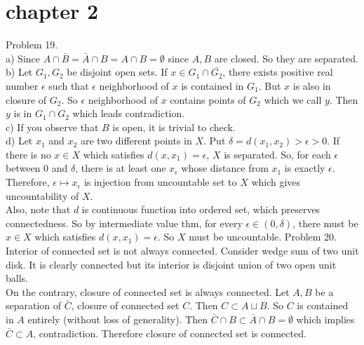 \section*{chapter 2}

Problem 19. \\

a) Since $A \cap \bar{B} = \bar{A} \cap B = A \cap B = \emptyset$ since $A, B$ are closed. So they are separated. \\

b) Let $G_1, G_2$ be disjoint open sets. If $x \in G_1 \cap \bar{G_2}$, there exists positive real number $\epsilon$ such that $\epsilon$ neighborhood of $x$ is contained in $G_1$. But $x$ is also in closure of $G_2$. So $\epsilon$ neighborhood of $x$ contains points of $G_2$ which we call $y$. Then $y$ is in $G_1 \cap G_2$ which leads contradiction. \\

c) If you observe that $B$ is open, it is trivial to check. \\

d) Let $x_1$ and $x_2$ are two different points in $X$. Put $\delta = d(x_1, x_2) > \epsilon > 0$. If there is no $x \in X$ which satisfies $d(x, x_1) = \epsilon$, $X$ is separated. So, for each $\epsilon$ between $0$ and $\delta$, there is at least one $x_{\epsilon}$ whose distance from $x_1$ is exactly $\epsilon$. Therefore, $\epsilon \mapsto x_{\epsilon}$ is injection from uncountable set to $X$ which gives uncountability of $X$. \\
Also, note that $d$ is continuous function into ordered set, which preserves connectedness. So by intermediate value thm, for every $\epsilon \in \left ( 0, \delta \right )$, there must be $x \in X$ which satisfies $d(x, x_1) = \epsilon$. So $X$ must be uncountable.
Problem 20. \\

Interior of connected set is not always connected. Consider wedge sum of two unit disk. It is clearly connected but its interior is disjoint union of two open unit balls. \\

On the contrary, closure of connected set is always connected. Let $A, B$ be a separation of $\bar{C}$, closure of connected set $C$. Then $C \subset A \sqcup B$. So $C$ is contained in $A$ entirely (without loss of generality). Then $\bar{C} \cap B \subset \bar{A} \cap B = \emptyset$ which implies $\bar{C} \subset A$, contradiction. Therefore closure of connected set is connected. \\


